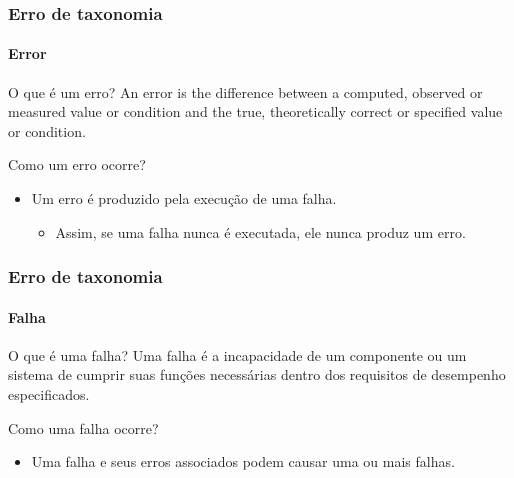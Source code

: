 \begin{frame}
\label{concept:error}
\frametitle{Erro de taxonomia}
\framesubtitle{Error}

\begin{block:concept}{O que é um erro?}
An error is the difference between a computed, observed or measured value
or condition and the true, theoretically correct or specified value or
condition.
\end{block:concept}

\begin{block:fact}{Como um erro ocorre?}
\begin{itemize}
	\item Um erro é produzido pela execução de uma falha.
	\begin{itemize}
		\item Assim, se uma falha nunca é executada, ele nunca produz um erro.
	\end{itemize}
\end{itemize}
\end{block:fact}
\end{frame}


\begin{frame}
\label{concept:failure}
\frametitle{Erro de taxonomia}
\framesubtitle{Falha}

\begin{block:concept}{O que é uma falha?}
Uma falha é a incapacidade de um componente ou um sistema de cumprir suas funções necessárias dentro dos requisitos de desempenho especificados.
\end{block:concept}

\begin{block:fact}{Como uma falha ocorre?}
\begin{itemize}
	\item Uma falha e seus erros associados podem causar uma ou mais falhas.
\end{itemize}
\end{block:fact}

\hfill
{}
\end{frame}



